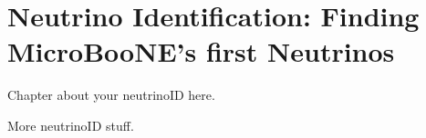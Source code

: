 \chapter{Neutrino Identification: Finding MicroBooNE's first Neutrinos} \label{ch:neutrinoID}
Chapter about your neutrinoID here.

\clearpage
More neutrinoID stuff.
